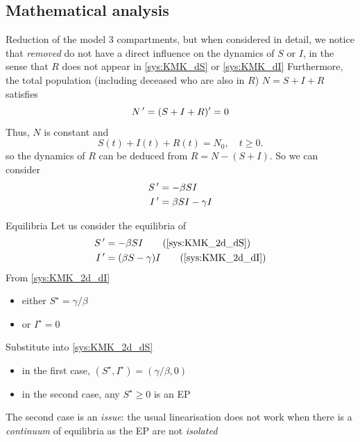\documentclass[aspectratio=169]{beamer}\usepackage[]{graphicx}\usepackage[]{xcolor}
\begin{document}
\subsection{Mathematical analysis}


\begin{frame}{Reduction of the model}
  3 compartments, but when considered in detail, we notice that \emph{removed} do not have a direct influence on the dynamics of $S$ or $I$, in the sense that $R$ does not appear in \eqref{sys:KMK_dS} or \eqref{sys:KMK_dI}
  \vfill
  Furthermore, the total population (including deceased who are also in $R$) $N=S+I+R$ satisfies
  \[
  N\,'=(S+I+R)'=0
  \]
  Thus, $N$ is constant and 
  \begin{equation}\label{eq:constant_population}
    S(t)+I(t)+R(t)=N_0,\quad t\geq 0.
  \end{equation}
  so the dynamics of $R$ can be deduced from $R=N-(S+I)$.
  So we can consider
  \begin{subequations}\label{sys:KMK_2d}
    \begin{align}
      S\,' &= -\beta SI \label{sys:KMK_2d_dS}\\
      I\,' &= \beta SI-\gamma I  \label{sys:KMK_2d_dI}
      \end{align}
    \end{subequations}
\end{frame}

\begin{frame}{Equilibria}
  Let us consider the equilibria of
  \begin{subequations}
    \begin{align}
      S\pprime &= -\beta SI 
      \tag{\ref{sys:KMK_2d_dS}} \\
      I\pprime &= (\beta S-\gamma)I  
      \tag{\ref{sys:KMK_2d_dI}}
    \end{align}
  \end{subequations}
\vfill
  From \eqref{sys:KMK_2d_dI}
  \begin{itemize}
    \item either $S^\star=\gamma/\beta$ 
    \item or $I^\star=0$
  \end{itemize}
  \vfill
  Substitute into \eqref{sys:KMK_2d_dS}
  \begin{itemize}
    \item in the first case, $(S^\star,I^\star)=(\gamma/\beta,0)$ 
    \item in the second case, any $S^\star\geq 0$ is an EP
  \end{itemize}
  \vfill
  The second case is an \emph{issue}: the usual linearisation does not work when there is a \emph{continuum} of equilibria as the EP are not \emph{isolated}
\end{frame}
\end{document}
